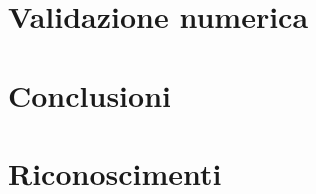 \documentclass[12pt,a4paper]{book}
\begin{document}
    \chapter{Validazione numerica}
    \label{CH:Val_num}
    
    
    \chapter{Conclusioni}
    \label{CH:Concl}
    
    
    \chapter{Riconoscimenti}
    \label{CH:Ric}
    
    
    
    
    
    \listoffigures
\end{document}
